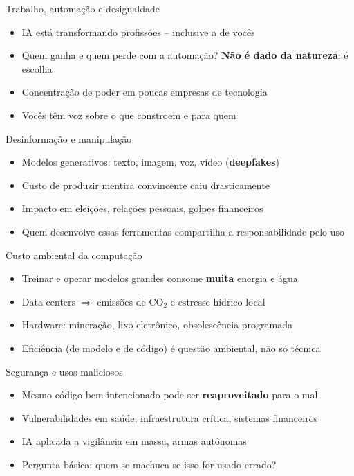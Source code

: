 \documentclass[aspectratio=169]{beamer}
\newcommand{\impt}[1]{\textcolor{maccent}{\textbf{#1}}}
\newcommand{\ntc}[1]{\textcolor{mprimary}{#1}}
\begin{document}
\begin{frame}{Trabalho, automa\c{c}\~ao e desigualdade}
\begin{itemize}
  \item IA est\'a transformando profiss\~oes -- inclusive a de voc\^es
  \pause
  \item Quem ganha e quem perde com a automa\c{c}\~ao? \impt{N\~ao \'e dado da natureza}: \'e escolha
  \pause
  \item Concentra\c{c}\~ao de poder em poucas empresas de tecnologia
  \pause
  \item \ntc{Voc\^es t\^em voz} sobre o que constroem e para quem
\end{itemize}
\end{frame}

\begin{frame}{Desinforma\c{c}\~ao e manipula\c{c}\~ao}
\begin{itemize}
  \item Modelos generativos: texto, imagem, voz, v\'ideo (\impt{deepfakes})
  \pause
  \item Custo de produzir mentira convincente caiu drasticamente
  \pause
  \item Impacto em elei\c{c}\~oes, rela\c{c}\~oes pessoais, golpes financeiros
  \pause
  \item Quem desenvolve essas ferramentas \ntc{compartilha} a responsabilidade pelo uso
\end{itemize}
\end{frame}

\begin{frame}{Custo ambiental da computa\c{c}\~ao}
\begin{itemize}
  \item Treinar e operar modelos grandes consome \impt{muita} energia e \'agua
  \pause
  \item Data centers $\Rightarrow$ emiss\~oes de CO$_2$ e estresse h\'idrico local
  \pause
  \item Hardware: mineração, lixo eletr\^onico, obsolesc\^encia programada
  \pause
  \item \ntc{Efici\^encia} (de modelo e de c\'odigo) \'e quest\~ao ambiental, n\~ao s\'o t\'ecnica
\end{itemize}
\end{frame}

\begin{frame}{Seguran\c{c}a e usos maliciosos}
\begin{itemize}
  \item Mesmo c\'odigo bem-intencionado pode ser \impt{reaproveitado} para o mal
  \pause
  \item Vulnerabilidades em sa\'ude, infraestrutura cr\'itica, sistemas financeiros
  \pause
  \item IA aplicada a vigil\^ancia em massa, armas aut\^onomas
  \pause
  \item Pergunta b\'asica: \ntc{quem se machuca} se isso for usado errado?
\end{itemize}
\end{frame}
\end{document}
